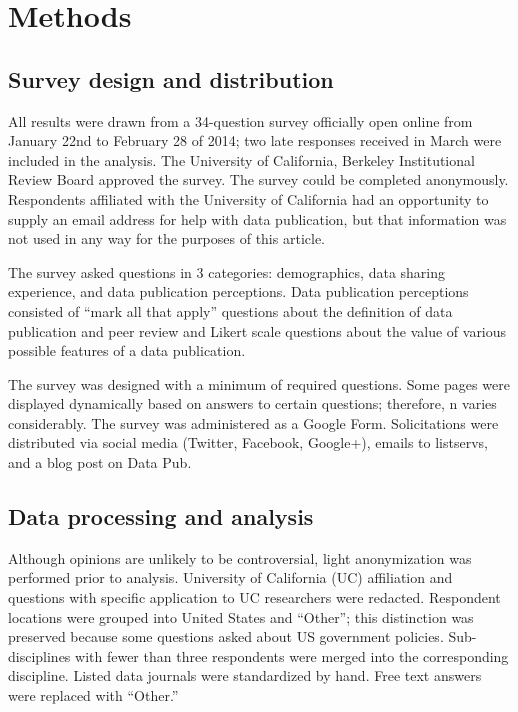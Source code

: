 \documentclass[10pt]{article}
\begin{document}
\section*{Methods}
\subsection*{Survey design and distribution}
All results were drawn from a 34-question survey officially open online from January 22nd to February 28 of 2014; two late responses received in March were included in the analysis.
The University of California, Berkeley Institutional Review Board approved the survey.
The survey could be completed anonymously.
Respondents affiliated with the University of California had an opportunity to supply an email address for help with data publication, but that information was not used in any way for the purposes of this article.

The survey asked questions in 3 categories: demographics, data sharing experience, and data publication perceptions.
Data publication perceptions consisted of ``mark all that apply'' questions about the definition of data publication and peer review and Likert scale questions about the value of various possible features of a data publication.

The survey was designed with a minimum of required questions.
Some pages were displayed dynamically based on answers to certain questions; therefore, n varies considerably.
The survey was administered as a Google Form.
Solicitations were distributed via social media (Twitter, Facebook, Google+), emails to listservs, and a blog post on Data Pub\cite{kratz_data_2014}.

\subsection*{Data processing and analysis}
Although opinions are unlikely to be controversial, light anonymization was performed prior to analysis.
University of California (UC) affiliation and questions with specific application to UC researchers were redacted.
Respondent locations were grouped into United States and ``Other''; this distinction was preserved because some questions asked about US government policies.  
Sub-disciplines with fewer than three respondents were merged into the corresponding discipline.
Listed data journals were standardized by hand.
Free text answers were replaced with ``Other.''
\end{document}
